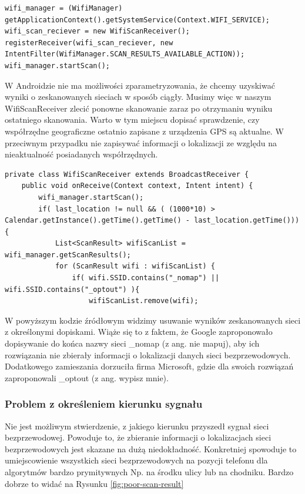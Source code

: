 \begin{verbatim}
wifi_manager = (WifiManager) getApplicationContext().getSystemService(Context.WIFI_SERVICE);
wifi_scan_reciever = new WifiScanReceiver();
registerReceiver(wifi_scan_reciever, new IntentFilter(WifiManager.SCAN_RESULTS_AVAILABLE_ACTION));
wifi_manager.startScan();
\end{verbatim}

W Androidzie nie ma możliwości zparametryzowania, że chcemy uzyskiwać wyniki o zeskanowanych sieciach w sposób ciągły. Musimy więc w naszym WifiScanReceiver zlecić ponowne skanowanie zaraz po otrzymaniu wyniku ostatniego skanowania. Warto w tym miejscu dopisać sprawdzenie, czy współrzędne geograficzne ostatnio zapisane z urządzenia GPS są aktualne. W przeciwnym przypadku nie zapisywać informacji o lokalizacji ze względu na nieaktualność posiadanych współrzędnych.

\begin{verbatim}
private class WifiScanReceiver extends BroadcastReceiver {
    public void onReceive(Context context, Intent intent) {
        wifi_manager.startScan();
        if( last_location != null && ( (1000*10) > Calendar.getInstance().getTime().getTime() - last_location.getTime())){
            List<ScanResult> wifiScanList = wifi_manager.getScanResults();
            for (ScanResult wifi : wifiScanList) {
                if( wifi.SSID.contains("_nomap") || wifi.SSID.contains("_optout") ){
                    wifiScanList.remove(wifi);
\end{verbatim}
W powyższym kodzie źródłowym widzimy usuwanie wyników zeskanowanych sieci z określonymi dopiskami. Wiąże się to z faktem, że Google zaproponowało dopisywanie do końca nazwy sieci \_nomap (z ang. nie mapuj), aby ich rozwiązania nie zbierały informacji o lokalizacji danych sieci bezprzewodowych.\cite{GoogleNomap} Dodatkowego zamieszania dorzuciła firma Microsoft, gdzie dla swoich rozwiązań zaproponowali \_optout (z ang. wypisz mnie).\cite{MicrosoftOptout}

\subsubsection{Problem z określeniem kierunku sygnału}
Nie jest możliwym stwierdzenie, z jakiego kierunku przyszedł sygnał sieci bezprzewodowej. Powoduje to, że zbieranie informacji o lokalizacjach sieci bezprzewodowych jest skazane na dużą niedokładność. Konkretniej spowoduje to umiejscowienie wszystkich sieci bezprzewodowych na pozycji telefonu dla algorytmów bardzo prymitywnych Np. na środku ulicy lub na chodniku. Bardzo dobrze to widać na Rysunku \ref{fig:poor-scan-result}

